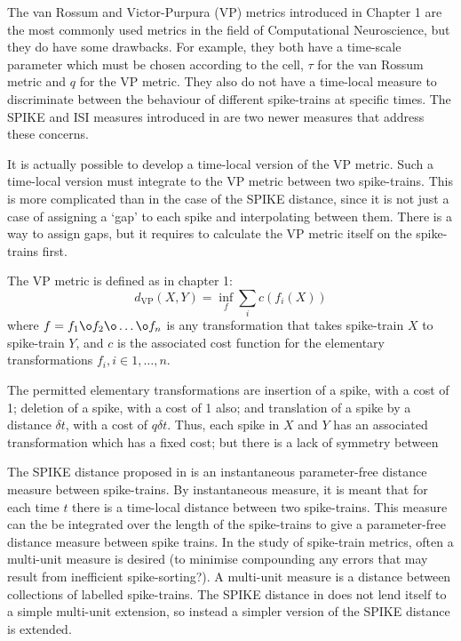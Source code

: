 The van Rossum \cite{VanRossum2001a} and Victor-Purpura \cite{VictorPurpura1996a} (VP) metrics introduced in Chapter 1 are the most commonly used metrics in the field of Computational Neuroscience, but they do have some drawbacks.  For example, they both have a time-scale parameter which must be chosen according to the cell, $\tau$ for the van Rossum metric and $q$ for the VP metric.  They also do not have a time-local measure to discriminate between the behaviour of different spike-trains at specific times.  The SPIKE and ISI measures introduced in \cite{KreuzEtAl2007a, Kreuzetal2011a} are two newer measures that address these concerns.

It is actually possible to develop a time-local version of the VP metric.  Such a time-local version must integrate to the VP metric between two spike-trains.  This is more complicated than in the case of the SPIKE distance, since it is not just a case of assigning a `gap' to each spike and interpolating between them.  There is a way to assign gaps, but it requires to calculate the VP metric itself on the spike-trains first.  

The VP metric is defined as in chapter 1:
\begin{equation}
d_{\text{VP}}(X,Y) = \inf_f \sum_i c(f_i(X))
\end{equation}
where $f = f_1\o f_2\o \ldots \o f_n$ is any transformation that takes spike-train $X$ to spike-train $Y$, and $c$ is the associated cost function for the elementary transformations $f_i, i\in 1,\ldots,n$.

The permitted elementary transformations are insertion of a spike, with a cost of 1; deletion of a spike, with a cost of 1 also; and translation of a spike by a distance $\delta t$, with a cost of $q\delta t$.  Thus, each spike in $X$ and $Y$ has an associated transformation which has a fixed cost; but there is a lack of symmetry between 

The SPIKE distance proposed in \cite{Kreuzetal2011a} is an instantaneous parameter-free distance measure between spike-trains.  By instantaneous measure, it is meant that for each time $t$ there is a time-local distance between two spike-trains.  This measure can the be integrated over the length of the spike-trains to give a parameter-free distance measure between spike trains. In the study of spike-train metrics, often a multi-unit measure is desired (to minimise compounding any errors that may result from inefficient spike-sorting?). A multi-unit measure is a distance between collections of labelled spike-trains.  The SPIKE distance in \cite{Kreuzetal2011a} does not lend itself to a simple multi-unit extension, so instead a simpler version of the SPIKE distance is extended.





